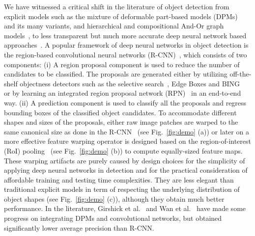 \documentclass[10pt,twocolumn,letterpaper]{article}
\begin{document}
We have witnessed a critical shift in the literature of object detection from explicit models such as the mixture of deformable part-based models (DPMs)~\cite{DPM} and its many variants, and hierarchical and compositional And-Or graph models~\cite{carAOG}, to less transparent but much more accurate deep neural network based approaches~\cite{lecun89,rcnn,fast_rcnn,faster_rcnn,resNet,googlenet,yolo,ssd,rfcn}. A popular framework of deep neural networks in object detection is the region-based convolutional neural networks (R-CNN)~\cite{rcnn}, which consists of two components: (i) A region proposal component is used to reduce the number of candidates to be classified. 
The proposals are generated  either by utilizing off-the-shelf objectness detectors such as the selective search~\cite{SS}, Edge Boxes \cite{edge_boxes} and BING~\cite{BING} or by learning an integrated region proposal network (RPN)~\cite{faster_rcnn} in an end-to-end way.
(ii) A prediction component is used to classify all the proposals and regress  bounding boxes of the classified object candidates. To accommodate different shapes and sizes of the proposals, either raw image patches are warped to the same canonical size as done in the R-CNN~\cite{rcnn} (see Fig.~\ref{fig:demo} (a)) or later on a more effective feature warping operator is designed based on the region-of-interest (RoI) pooling~\cite{fast_rcnn} (see Fig.~\ref{fig:demo} (b)) to compute equally-sized feature maps. These warping artifacts are purely caused by design choices for the simplicity of applying deep neural networks in detection and for the practical consideration of affordable training and testing time complexities. They are less elegant than traditional explicit models in term of respecting the underlying distribution of object shapes (see Fig.~\ref{fig:demo} (c)), although they obtain much better performance. In the literature, Girshick et al.~\cite{dpdpm} and Wan et al.~\cite{wanli} have made some progress on integrating DPMs and convolutional networks, but obtained significantly lower average precision than R-CNN.
\end{document}
